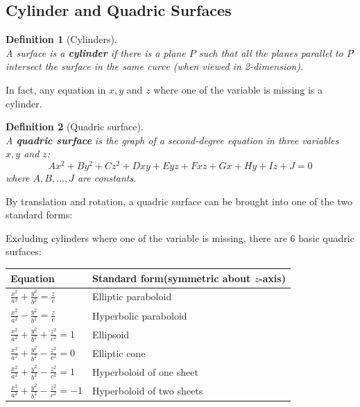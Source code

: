 \documentclass[12pt]{article}
\newtheorem{definition}{Definition}[section]
\theoremstyle{definition}
\begin{document}
\subsection{Cylinder and Quadric Surfaces}
\begin{definition}[Cylinders]
\hfill\\\normalfont A surface is a \textbf{cylinder} if there is a plane $P$ such that \textit{all} the planes parallel to $P$ intersect the surface in the \textit{same} curve (when viewed in 2-dimension).
\end{definition}
In fact, any equation in $x,y$ and $z$ where one of the variable is missing is a cylinder.
\begin{definition}[Quadric surface]
\hfill\\\normalfont A \textbf{quadric surface} is the graph of a \textit{second}-degree equation in three variables $x,y$ and $z$:
\[
Ax^2+By^2+Cz^2+Dxy+Eyz+Fxz+Gx+Hy+Iz+J = 0
\]
where $A, B,\ldots, J$ are constants.
\end{definition}
By translation and rotation, a quadric surface can be brought into one of the two standard forms:\\
\begin{center}
\end{center}
Excluding cylinders where one of the variable is missing, there are 6 basic quadric surfaces:
\begin{table}[h]
\centering
\begin{tabular}{|l|p{5cm}|}
\hline
Equation&\begin{minipage}{5cm}\centering Standard form\newline (symmetric about $z$-axis)\end{minipage}\\\hline
$\frac{x^2}{a^2}+\frac{y^2}{b^2}=\frac{z}{c}$&Elliptic paraboloid\\\hline
$\frac{x^2}{a^2}-\frac{y^2}{b^2}=\frac{z}{c}$&Hyperbolic paraboloid\\\hline
$\frac{x^2}{a^2}+\frac{y^2}{b^2}+\frac{z^2}{c^2}=1$&Ellipsoid\\\hline
$\frac{x^2}{a^2}+\frac{y^2}{b^2}-\frac{z^2}{c^2}=0$&Elliptic cone\\\hline
$\frac{x^2}{a^2}+\frac{y^2}{b^2}-\frac{z^2}{c^2}=1$&Hyperboloid of one sheet\\\hline
$\frac{x^2}{a^2}+\frac{y^2}{b^2}-\frac{z^2}{c^2}=-1$&Hyperboloid of two sheets\\\hline
\end{tabular}
\end{table}
\end{document}
